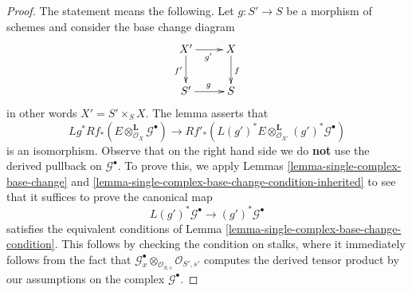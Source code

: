 \documentclass{stacks-project}
\theoremstyle{plain}
\theoremstyle{definition}
\theoremstyle{remark}
\numberwithin{equation}{subsection}
\begin{document}
\begin{proof}
The statement means the following. Let $g : S' \to S$ be a morphism of
schemes and consider the base change diagram
$$
\xymatrix{
X' \ar[r]_{g'} \ar[d]_{f'} &
X \ar[d]^f \\
S' \ar[r]^g &
S
}
$$
in other words $X' = S' \times_S X$. The lemma asserts that
$$
Lg^*Rf_*(E \otimes^\mathbf{L}_{\mathcal{O}_X} \mathcal{G}^\bullet)
\longrightarrow
Rf'_*\left(
L(g')^*E \otimes^\mathbf{L}_{\mathcal{O}_{X'}} (g')^*\mathcal{G}^\bullet
\right)
$$
is an isomorphism. Observe that on the right hand side we do {\bf not}
use the derived pullback on $\mathcal{G}^\bullet$.
To prove this, we apply Lemmas \ref{lemma-single-complex-base-change} and
\ref{lemma-single-complex-base-change-condition-inherited} to see that it
suffices to prove the canonical map
$$
L(g')^*\mathcal{G}^\bullet \to (g')^*\mathcal{G}^\bullet
$$
satisfies the equivalent conditions of
Lemma \ref{lemma-single-complex-base-change-condition}.
This follows by checking the condition on stalks, where it
immediately follows from the fact that
$\mathcal{G}^\bullet_x \otimes_{\mathcal{O}_{S, s}} \mathcal{O}_{S', s'}$
computes the derived tensor product by our assumptions on the complex
$\mathcal{G}^\bullet$.
\end{proof}
\end{document}
